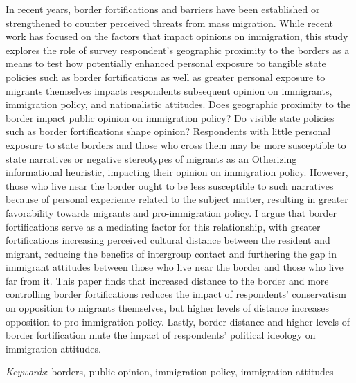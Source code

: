 \documentclass[12pt,]{article}
\renewenvironment{abstract}
 {{%
    \setlength{\leftmargin}{0mm}
    \setlength{\rightmargin}{\leftmargin}%
  }%
  \relax}
 {\endlist}
\begin{document}
\begin{abstract}

    \hbox{\vrule height .2pt width 39.14pc}

    \vskip 8.5pt %

\noindent In recent years, border fortifications and barriers have been
established or strengthened to counter perceived threats from mass
migration. While recent work has focused on the factors that impact
opinions on immigration, this study explores the role of survey
respondent's geographic proximity to the borders as a means to test how
potentially enhanced personal exposure to tangible state policies such
as border fortifications as well as greater personal exposure to
migrants themselves impacts respondents subsequent opinion on
immigrants, immigration policy, and nationalistic attitudes. Does
geographic proximity to the border impact public opinion on immigration
policy? Do visible state policies such as border fortifications shape
opinion? Respondents with little personal exposure to state borders and
those who cross them may be more susceptible to state narratives or
negative stereotypes of migrants as an Otherizing informational
heuristic, impacting their opinion on immigration policy. However, those
who live near the border ought to be less susceptible to such narratives
because of personal experience related to the subject matter, resulting
in greater favorability towards migrants and pro-immigration policy. I
argue that border fortifications serve as a mediating factor for this
relationship, with greater fortifications increasing perceived cultural
distance between the resident and migrant, reducing the benefits of
intergroup contact and furthering the gap in immigrant attitudes between
those who live near the border and those who live far from it. This
paper finds that increased distance to the border and more controlling
border fortifications reduces the impact of respondents' conservatism on
opposition to migrants themselves, but higher levels of distance
increases opposition to pro-immigration policy. Lastly, border distance
and higher levels of border fortification mute the impact of
respondents' political ideology on immigration attitudes.


\vskip 8.5pt \noindent \emph{Keywords}: borders, public opinion,
immigration policy, immigration attitudes \par

    \hbox{\vrule height .2pt width 39.14pc}



\end{abstract}
\end{document}
